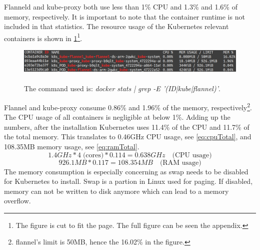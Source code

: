 Flanneld and kube-proxy both use less than 1\% CPU and 1.3\% and 1.6\% of memory, respectively. It is important to note that the container runtime is not included in that statistics. The resource usage of the Kubernetes relevant containers is shown in \cref{fig:kubernetesResourceConsumptionCut}\footnote{The figure is cut to fit the page. The full figure can be seen the appendix.}.
\begin{figure}[h!]
    \centering
    \includegraphics[scale=1.6]{figures/kubeContainerResourceUsageCut.png}
    \vspace*{-0.3cm}
    \caption[The Resource Usage of Kubernetes Containers.]{\\The command used is: \textit{docker stats | grep -E '(ID|kube|flannel)'}.}
    \label{fig:kubernetesResourceConsumptionCut}
\end{figure}
Flannel and kube-proxy consume 0.86\% and 1.96\% of the memory, respectively\footnote{flannel's limit is 50MB, hence the 16.02\% in the figure.}. The CPU usage of all containers is negligible at below 1\%. Adding up the numbers, after the installation Kubernetes uses 11.4\% of the CPU and 11.7\% of the total memory. This translates to 0.46GHz CPU usage, see \cref{eq:cpuTotal}, and 108.35MB memory usage, see \cref{eq:ramTotal}.
\begin{equation} \label{eq:cpuTotal}
    1.4GHz * 4 \; \textrm{(cores)} * 0.114 = 0.638GHz  \quad \textrm{(CPU usage)}
  \end{equation}
  \begin{equation} \label{eq:ramTotal}
    926.1MB * 0.117 = 108.354MB  \quad \textrm{(RAM usage)}
  \end{equation}
The memory consumption is especially concerning as swap needs to be disabled for Kubernetes to install. Swap is a partion in Linux used for paging. If disabled, memory can not be written to disk anymore which can lead to a memory overflow.